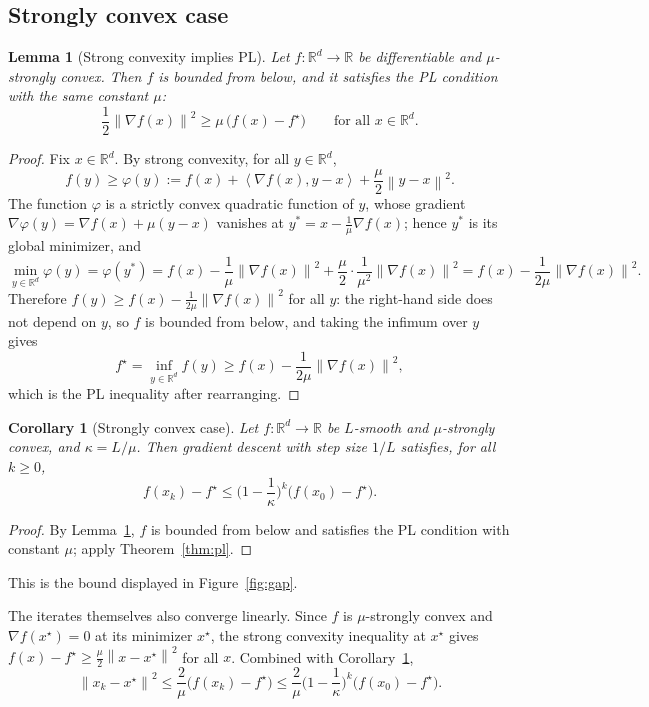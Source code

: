 \documentclass[11pt,a4paper]{article}
\newtheorem{lemma}{Lemma}
\newtheorem{corollary}{Corollary}
\theoremstyle{definition}
\theoremstyle{remark}
\newcommand{\R}{\mathbb{R}}
\newcommand{\norm}[1]{\left\lVert #1 \right\rVert}
\newcommand{\ip}[2]{\left\langle #1, #2 \right\rangle}
\begin{document}
\subsection{Strongly convex case}\label{sec:sc}

\begin{lemma}[Strong convexity implies PL]\label{lem:sc-pl}
Let $f : \R^d \to \R$ be differentiable and $\mu$-strongly convex. Then $f$ is bounded from below, and it satisfies the PL condition with the same constant $\mu$:
\[
\frac12 \norm{\nabla f(x)}^2 \ge \mu\,\big(f(x) - f^\star\big) \qquad \text{for all } x \in \R^d.
\]
\end{lemma}

\begin{proof}
Fix $x \in \R^d$. By strong convexity, for all $y \in \R^d$,
\[
f(y) \ge \varphi(y) := f(x) + \ip{\nabla f(x)}{y - x} + \frac{\mu}{2}\norm{y - x}^2 .
\]
The function $\varphi$ is a strictly convex quadratic function of $y$, whose gradient $\nabla\varphi(y) = \nabla f(x) + \mu(y - x)$ vanishes at $y^\ast = x - \frac{1}{\mu}\nabla f(x)$; hence $y^\ast$ is its global minimizer, and
\[
\min_{y \in \R^d} \varphi(y) = \varphi(y^\ast) = f(x) - \frac{1}{\mu}\norm{\nabla f(x)}^2 + \frac{\mu}{2}\cdot\frac{1}{\mu^2}\norm{\nabla f(x)}^2 = f(x) - \frac{1}{2\mu}\norm{\nabla f(x)}^2 .
\]
Therefore $f(y) \ge f(x) - \frac{1}{2\mu}\norm{\nabla f(x)}^2$ for all $y$: the right-hand side does not depend on $y$, so $f$ is bounded from below, and taking the infimum over $y$ gives
\[
f^\star = \inf_{y \in \R^d} f(y) \ge f(x) - \frac{1}{2\mu}\norm{\nabla f(x)}^2 ,
\]
which is the PL inequality after rearranging.
\end{proof}

\begin{corollary}[Strongly convex case]\label{cor:sc-rate}
Let $f : \R^d \to \R$ be $L$-smooth and $\mu$-strongly convex, and $\kappa = L/\mu$. Then gradient descent with step size $1/L$ satisfies, for all $k \ge 0$,
\[
f(x_k) - f^\star \le \Big(1 - \frac{1}{\kappa}\Big)^k \big(f(x_0) - f^\star\big).
\]
\end{corollary}

\begin{proof}
By Lemma~\ref{lem:sc-pl}, $f$ is bounded from below and satisfies the PL condition with constant $\mu$; apply Theorem~\ref{thm:pl}.
\end{proof}

This is the bound displayed in Figure~\ref{fig:gap}.

The iterates themselves also converge linearly. Since $f$ is $\mu$-strongly convex and $\nabla f(x^\star) = 0$ at its minimizer $x^\star$, the strong convexity inequality at $x^\star$ gives $f(x) - f^\star \ge \frac{\mu}{2}\norm{x - x^\star}^2$ for all $x$. Combined with Corollary~\ref{cor:sc-rate},
\[
\norm{x_k - x^\star}^2 \le \frac{2}{\mu}\big(f(x_k) - f^\star\big) \le \frac{2}{\mu}\Big(1 - \frac{1}{\kappa}\Big)^k \big(f(x_0) - f^\star\big).
\]
\end{document}
